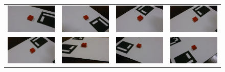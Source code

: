 \begin{figure}
\begin{tabular}{cccc}
  \includegraphics[width=0.25\linewidth]{img/classTestImg/09_rand} &   \includegraphics[width=0.25\linewidth]{img/classTestImg/10_rand} & \includegraphics[width=0.25\linewidth]{img/classTestImg/11_rand} &
\includegraphics[width=0.25\linewidth]{img/classTestImg/12_rand} \\
\includegraphics[width=0.25\linewidth]{img/classTestImg/12_rand} &   \includegraphics[width=0.25\linewidth]{img/classTestImg/14_rand} & \includegraphics[width=0.25\linewidth]{img/classTestImg/15_rand} &
\includegraphics[width=0.25\linewidth]{img/classTestImg/16_rand} \\

\end{tabular}
\end{figure}
